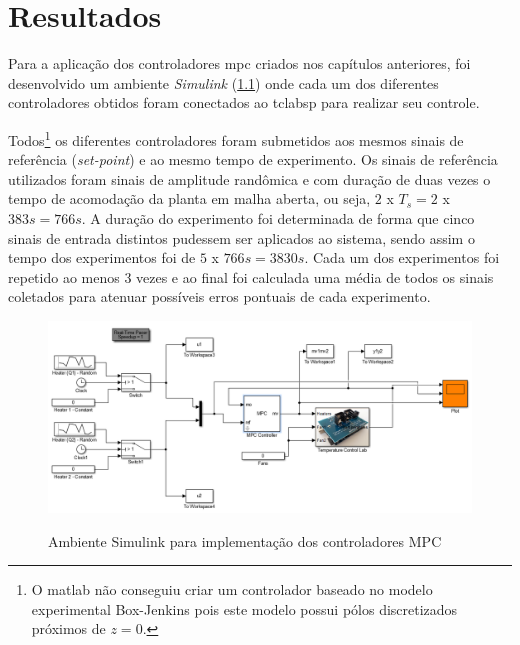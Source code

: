 
\chapter{Resultados}
\label{ch:resultados}

Para a aplicação dos controladores \acrshort{mpc} criados nos capítulos anteriores, foi desenvolvido um
ambiente \textit{Simulink} (\cref{fig:simulinkusingmpc}) onde cada um dos diferentes controladores obtidos
foram conectados ao \acrshort{tclabsp} para realizar seu controle.

Todos\footnote{
    O \acrshort{matlab} não conseguiu criar um controlador baseado no modelo experimental Box-Jenkins
    pois este modelo possui pólos discretizados próximos de $z=0$.
}  os diferentes controladores foram submetidos aos mesmos sinais de referência (\textit{set-point})
e ao mesmo tempo de experimento. Os sinais de referência utilizados foram sinais de amplitude randômica
e com duração de duas vezes o tempo de acomodação da planta em malha aberta, ou seja, $2$ x $T_s = 2$ x $383s = 766s$.
A duração do experimento foi determinada de forma que cinco sinais de entrada distintos pudessem ser
aplicados ao sistema, sendo assim o tempo dos experimentos foi de $5$ x $766s = 3830s$.
Cada um dos experimentos foi repetido ao menos 3 vezes e ao final foi calculada uma média de todos os 
sinais coletados para atenuar possíveis erros pontuais de cada experimento.

\begin{figure}[!h]
	\caption{Ambiente Simulink para implementação dos controladores MPC}
	\begin{center}
		\includegraphics[width=1.00\textwidth]{./5_images/SimulinkUsingMPC.png} 
		\label{fig:simulinkusingmpc}
	\end{center}
	\centering
\end{figure}

